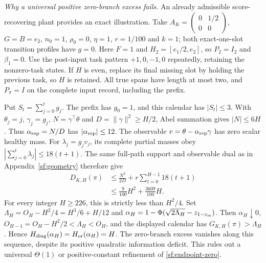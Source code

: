 \par\smallskip\noindent\emph{Why a universal positive zero-branch excess fails.}
An already admissible score-recovering plant provides an exact illustration.
Take $A_K=\left(\begin{smallmatrix}0&1/2\\0&0\end{smallmatrix}\right)$,
$G=B=e_2$, $n_0=1$, $\rho_0=0$, $\eta=1$, $r=1/100$ and $k=1$;
both exact-one-slot transition profiles have $g=0$.
Here $F=1$ and $H_2=[e_1/2,e_2]$, so $P_2=I_2$ and $\beta_1=0$.
Use the post-input task pattern $+1,0,-1,0$ repeatedly, retaining the
nonzero-task states. If $H$ is even, replace its final missing slot by
holding the previous task, so $H$ is retained. All true spans have length
at most two, and $P_\pi=I$ on the complete input record, including the prefix.

Put $S_t=\sum_{j=0}^t g_j$. The prefix has $g_0=1$, and this calendar
has $|S_t|\le3$. With $\theta_j=j$, $\gamma_j=g_j$,
$N=\gamma^\top\theta$ and $D=\|\gamma\|^2\ge H/2$, Abel summation gives
$|N|\le6H$. Thus $\alpha_{\rm rep}=N/D$ has $|\alpha_{\rm rep}|\le12$.
The observable $v=\theta-\alpha_{\rm rep}\gamma$ has zero scalar healthy mass.
For $\lambda_j=g_jv_j$, its complete partial masses obey
$|\sum_{j=0}^t\lambda_j|\le18(t+1)$.
The same full-path support and observable dual as in
Appendix~\ref{sf:geometry} therefore give
\begin{equation}\label{sf:endpoint-rounding-example}
\begin{aligned}
D_{K,H}(\pi)
 &\le\frac{N^2}{2D}+r\sum_{t=0}^{H-1}18(t+1)\\
 &\le\frac9{100}H^2+\frac{3609}{100}H.
\end{aligned}
\end{equation}
For every integer $H\ge226$, this is strictly less than $H^2/4$.
Set $\Lambda_H=O_H-H^2/4=H^3/6+H/12$ and
$\alpha_H=1-\Phi(\sqrt{2\Lambda_H}-z_{1-\varepsilon_{\rm m}})$.
Then $\alpha_H\downarrow0$,
$O_{H-1}=O_H-H^2/2<\Lambda_H<O_H$, and the displayed calendar has
$G_{K,H}(\pi)>\Lambda_H$. Hence
$H_{\rm diag}(\alpha_H)=H_{\rm or}(\alpha_H)=H$.
The zero-branch excess vanishes along this sequence, despite its positive
quadratic information deficit. This rules out a universal $\Theta(1)$
or positive-constant refinement of \eqref{sf:endpoint-zero}.

